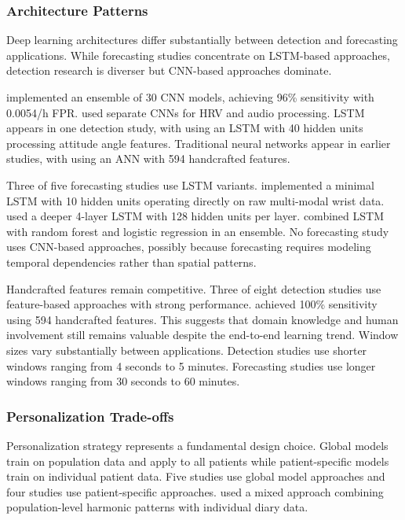 \subsubsection{Architecture Patterns}

Deep learning architectures differ substantially between detection and forecasting applications. While forecasting studies concentrate on LSTM-based approaches, detection research is diverser but CNN-based approaches dominate. 

\textcite{spahrDeepLearningbasedDetection2025} implemented an ensemble of 30 CNN models, achieving 96\% sensitivity with 0.0054/h FPR. \textcite{elemamAutomatedValidatedTool2025} used separate CNNs for HRV and audio processing. LSTM appears in one detection study, with \textcite{wangEpilepticSeizureDetection2025} using an LSTM with 40 hidden units processing attitude angle features. Traditional neural networks appear in earlier studies, with \textcite{fineDetectionKeyAutomated2025} using an ANN with 594 handcrafted features.

Three of five forecasting studies use LSTM variants. \textcite{meiselMachineLearningWristband2020} implemented a minimal LSTM with 10 hidden units operating directly on raw multi-modal wrist data. \textcite{nasseriAmbulatorySeizureForecasting2021} used a deeper 4-layer LSTM with 128 hidden units per layer. \textcite{stirlingForecastingSeizureLikelihood2021} combined LSTM with random forest and logistic regression in an ensemble. No forecasting study uses CNN-based approaches, possibly because forecasting requires modeling temporal dependencies rather than spatial patterns.

Handcrafted features remain competitive. Three of eight detection studies use feature-based approaches with strong performance. \textcite{fineDetectionKeyAutomated2025} achieved 100\% sensitivity using 594 handcrafted features. This suggests that domain knowledge and human involvement still remains valuable despite the end-to-end learning trend. Window sizes vary substantially between applications. Detection studies use shorter windows ranging from 4 seconds to 5 minutes. Forecasting studies use longer windows ranging from 30 seconds to 60 minutes.

\subsubsection{Personalization Trade-offs}

Personalization strategy represents a fundamental design choice. Global models train on population data and apply to all patients while patient-specific models train on individual patient data. Five studies use global model approaches and four studies use patient-specific approaches. \textcite{vielufSeizureMonitoringCombined2025} used a mixed approach combining population-level harmonic patterns with individual diary data.

